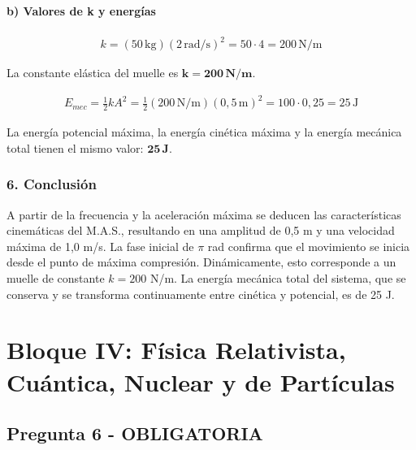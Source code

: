 \paragraph*{b) Valores de k y energías}
\begin{gather}
    k = (50 \, \text{kg})(2 \, \text{rad/s})^2 = 50 \cdot 4 = 200 \, \text{N/m}
\end{gather}
\begin{cajaresultado}
    La constante elástica del muelle es $\boldsymbol{k=200 \, \textbf{N/m}}$.
\end{cajaresultado}
\begin{gather}
    E_{mec} = \frac{1}{2} k A^2 = \frac{1}{2} (200 \, \text{N/m}) (0,5 \, \text{m})^2 = 100 \cdot 0,25 = 25 \, \text{J}
\end{gather}
\begin{cajaresultado}
    La energía potencial máxima, la energía cinética máxima y la energía mecánica total tienen el mismo valor: $\boldsymbol{25 \, \textbf{J}}$.
\end{cajaresultado}

\subsubsection*{6. Conclusión}
\begin{cajaconclusion}
    A partir de la frecuencia y la aceleración máxima se deducen las características cinemáticas del M.A.S., resultando en una amplitud de 0,5 m y una velocidad máxima de 1,0 m/s. La fase inicial de $\pi$ rad confirma que el movimiento se inicia desde el punto de máxima compresión. Dinámicamente, esto corresponde a un muelle de constante $k=200$ N/m. La energía mecánica total del sistema, que se conserva y se transforma continuamente entre cinética y potencial, es de 25 J.
\end{cajaconclusion}

\newpage
\section{Bloque IV: Física Relativista, Cuántica, Nuclear y de Partículas}
\label{sec:nuclear_2025_jul_ext}
\subsection{Pregunta 6 - OBLIGATORIA}
\label{subsec:6_2025_jul_ext}

